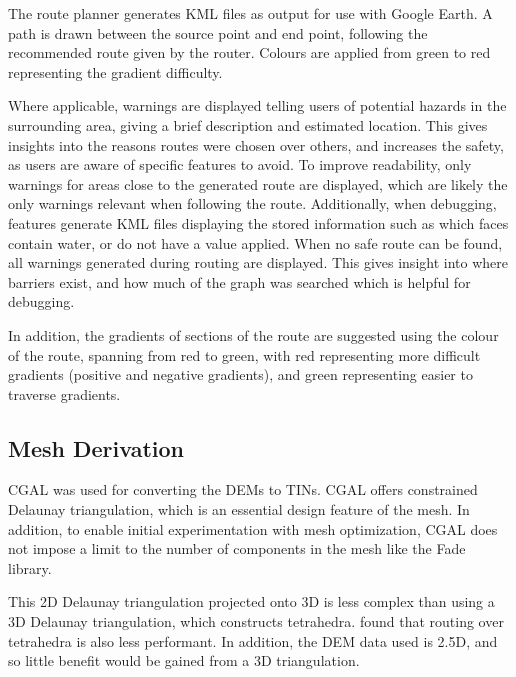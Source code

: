 \documentclass[12pt]{article}
\begin{document}
The route planner generates KML files as output for use with Google Earth. A path is drawn between the source point and end point, following the recommended route given by the router. Colours are applied from green to red representing the gradient difficulty.

Where applicable, warnings are displayed telling users of potential hazards in the surrounding area, giving a brief description and estimated location. This gives insights into the reasons routes were chosen over others, and increases the safety, as users are aware of specific features to avoid. To improve readability, only warnings for areas close to the generated route are displayed, which are likely the only warnings relevant when following the route. Additionally, when debugging, features generate KML files displaying the stored information such as which faces contain water, or do not have a value applied. When no safe route can be found, all warnings generated during routing are displayed. This gives insight into where barriers exist, and how much of the graph was searched which is helpful for debugging.

In addition, the gradients of sections of the route are suggested using the colour of the route, spanning from red to green, with red representing more difficult gradients (positive and negative gradients), and green representing easier to traverse gradients.

\subsection{Mesh Derivation}

CGAL was used for converting the DEMs to TINs. CGAL offers constrained Delaunay triangulation, which is an essential design feature of the mesh. In addition, to enable initial experimentation with mesh optimization, CGAL does not impose a limit to the number of components in the mesh like the Fade library.


This 2D Delaunay triangulation projected onto 3D is less complex than using a 3D Delaunay triangulation, which constructs tetrahedra. \textcite{perkins2013fielddstar} found that routing over tetrahedra is also less performant. In addition, the DEM data used is 2.5D, and so little benefit would be gained from a 3D triangulation.
\end{document}
